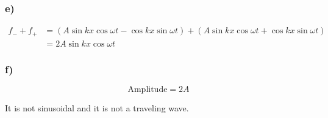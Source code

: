 \documentclass[../homework.tex]{subfiles}
\begin{document}
\subsubsection*{e)}
\begin{align*}
    f_- + f_+ &= (A \sin kx \cos \omega t - \cos kx \sin \omega t) + (A \sin kx \cos \omega t + \cos kx \sin \omega t) \\
    &= 2A \sin kx \cos \omega t
\end{align*}

\subsubsection*{f)}
\begin{equation*}
    \text{Amplitude} = 2A
\end{equation*}

It is not sinusoidal and it is not a traveling wave.
\end{document}
